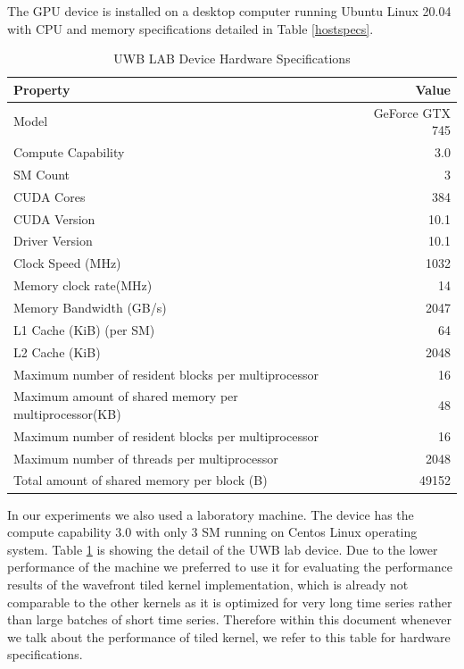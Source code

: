 \documentclass[12pt, letterpaper]{article}
\begin{document}
The GPU device is installed on a desktop computer running Ubuntu Linux 20.04
with CPU and memory specifications detailed in Table \ref{hostspecs}.


\begin{table}[htbp]
  \centering
  \caption{UWB LAB Device Hardware Specifications}
  \label{specslab}
  \begin{tabular}{lr}
      \toprule
          Property                & Value                           \\
          \midrule
          Model                   & GeForce GTX 745                 \\
          Compute Capability      & 3.0                             \\
          SM Count                & 3                               \\
          CUDA Cores              & 384                            \\
          CUDA Version            & 10.1                            \\
          Driver Version          & 10.1                          \\
          Clock Speed (MHz)       & 1032                            \\
          Memory clock rate(MHz)  & 14                              \\
          Memory Bandwidth (GB/s) & 2047                             \\
          L1 Cache (KiB) (per SM) & 64                              \\
          L2 Cache (KiB)          & 2048                             \\
          Maximum number of resident blocks per multiprocessor &16   \\
          Maximum amount of shared memory per multiprocessor(KB) & 48 \\
          Maximum number of resident blocks per multiprocessor &16 \\
          Maximum number of threads per multiprocessor  &2048 \\
          Total amount of shared memory per block (B)   &49152 \\
          \bottomrule
  \end{tabular}
\end{table}

In our experiments we also used a laboratory machine. The device has the compute
capability 3.0 with only 3 SM running on Centos Linux operating system. Table
\ref{specslab} is showing the detail of the UWB lab device. Due to the lower
performance of the machine we preferred to use it for evaluating the performance
results of the wavefront tiled kernel implementation, which is already not
comparable to the other kernels as it is optimized for very long time series
rather than large batches of short time series. Therefore within this document
whenever we talk about the performance of tiled kernel, we refer to this table
for hardware specifications.
\end{document}
